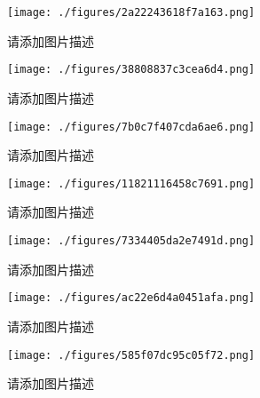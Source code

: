 
\begin{issues}
\issueDraft
\end{issues}

\begin{figure}[ht]
\centering
\texttt{[image: ./figures/2a22243618f7a163.png]}
\caption{请添加图片描述} \label{fig_PhText_1}
\end{figure}

\begin{figure}[ht]
\centering
\texttt{[image: ./figures/38808837c3cea6d4.png]}
\caption{请添加图片描述} \label{fig_PhText_2}
\end{figure}

\begin{figure}[ht]
\centering
\texttt{[image: ./figures/7b0c7f407cda6ae6.png]}
\caption{请添加图片描述} \label{fig_PhText_3}
\end{figure}

\begin{figure}[ht]
\centering
\texttt{[image: ./figures/11821116458c7691.png]}
\caption{请添加图片描述} \label{fig_PhText_4}
\end{figure}

\begin{figure}[ht]
\centering
\texttt{[image: ./figures/7334405da2e7491d.png]}
\caption{请添加图片描述} \label{fig_PhText_5}
\end{figure}

\begin{figure}[ht]
\centering
\texttt{[image: ./figures/ac22e6d4a0451afa.png]}
\caption{请添加图片描述} \label{fig_PhText_6}
\end{figure}

\begin{figure}[ht]
\centering
\texttt{[image: ./figures/585f07dc95c05f72.png]}
\caption{请添加图片描述} \label{fig_PhText_7}
\end{figure}